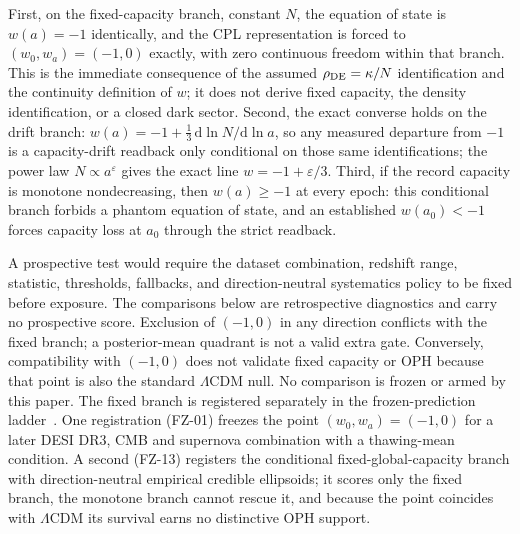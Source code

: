 \documentclass[11pt]{article}
\theoremstyle{remark}
\begin{document}
First, on the fixed-capacity branch, constant \(N\), the equation of state
is \(w(a)=-1\) identically, and the CPL representation is forced to
\((w_0,w_a)=(-1,0)\) exactly, with zero continuous freedom within that
branch. This is the immediate consequence of the assumed
\(\rho_{\rm DE}=\kappa/N\) identification and the continuity definition of
\(w\); it does not derive fixed capacity, the density identification, or a
closed dark sector. Second, the exact converse holds on the drift branch:
\(w(a)=-1+\tfrac13\,\mathrm d\ln N/\mathrm d\ln a\), so any measured
departure from \(-1\) is a capacity-drift readback only conditional on
those same identifications; the power law
\(N\propto a^{\varepsilon}\) gives the exact line
\(w=-1+\varepsilon/3\). Third, if the record capacity is monotone
nondecreasing, then \(w(a)\ge-1\) at every epoch: this conditional branch
forbids a phantom equation of state, and an established
\(w(a_0)<-1\) forces capacity loss at \(a_0\) through the strict readback.

A prospective test would require the dataset combination, redshift range,
statistic, thresholds, fallbacks, and direction-neutral systematics policy to
be fixed before exposure. The comparisons below are retrospective diagnostics
and carry no prospective score. Exclusion of \((-1,0)\) in any direction
conflicts with the fixed branch; a posterior-mean quadrant is not a valid
extra gate. Conversely, compatibility with \((-1,0)\) does not validate
fixed capacity or OPH because that point is also the standard
\(\Lambda\)CDM null. No comparison is frozen or armed by this paper. The
fixed branch is registered separately in the frozen-prediction
ladder~\cite{ophladder}. One registration (FZ-01) freezes the point
\((w_0,w_a)=(-1,0)\) for a later DESI DR3, CMB and supernova combination with
a thawing-mean condition. A second (FZ-13) registers the conditional
fixed-global-capacity branch with direction-neutral empirical credible
ellipsoids; it scores only the fixed branch, the monotone branch cannot
rescue it, and because the point coincides with \(\Lambda\)CDM its survival
earns no distinctive OPH support.
\end{document}
